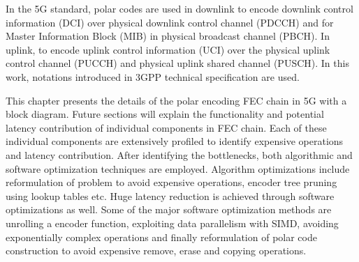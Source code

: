 In the 5G standard, polar codes are used in downlink to encode downlink control information (DCI) over physical downlink control channel (PDCCH) and for Master Information Block (MIB) in physical broadcast channel (PBCH). In uplink, to encode uplink control information (UCI) over the physical uplink control channel (PUCCH) and physical uplink shared channel (PUSCH). In this work, notations introduced in 3GPP technical specification \cite{3gpp.38.212} are used.

This chapter presents the details of the polar encoding FEC chain in 5G with a block diagram. Future sections will explain the functionality and potential latency contribution of individual components in FEC chain. Each of these individual components are extensively profiled to identify expensive operations and latency contribution. After identifying the bottlenecks, both algorithmic and software optimization techniques are employed. Algorithm optimizations include reformulation of problem to avoid expensive operations, encoder tree pruning using lookup tables etc. Huge latency reduction is achieved through software optimizations as well. Some of the major software optimization methods are unrolling a encoder function, exploiting data parallelism with SIMD, avoiding exponentially complex operations and finally reformulation of polar code construction to avoid expensive remove, erase and copying operations.


